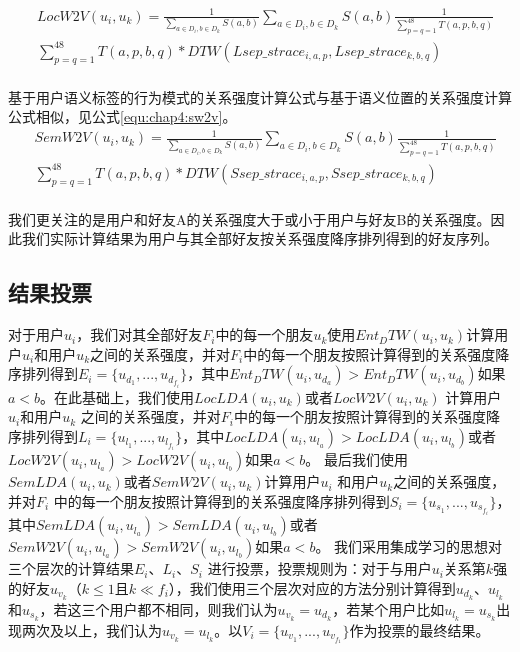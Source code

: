 \begin{equation}
\label{equ:chap4:lw2v}
\begin{split}
&LocW2V(u_{i},u_{k})=\frac{1}{\sum_{a\in D_{i},b\in D_{k}}S(a,b)}\sum_{a\in D_{i},b\in D_{k}}S(a,b)\frac{1}{\sum_{p=q=1}^{48}T(a,p,b,q)}\\
&\sum_{p=q=1}^{48}T(a,p,b,q)\ast DTW(Lsep\_strace_{i,a,p},Lsep\_strace_{k,b,q})\\
\end{split}
\end{equation}
\par 基于用户语义标签的行为模式的关系强度计算公式与基于语义位置的关系强度计算公式相似，见公式\ref{equ:chap4:sw2v}。
\begin{equation}
\label{equ:chap4:sw2v}
\begin{split}
&SemW2V(u_{i},u_{k})=\frac{1}{\sum_{a\in D_{i},b\in D_{k}}S(a,b)}\sum_{a\in D_{i},b\in D_{k}}S(a,b)\frac{1}{\sum_{p=q=1}^{48}T(a,p,b,q)}\\
&\sum_{p=q=1}^{48}T(a,p,b,q)\ast DTW(Ssep\_strace_{i,a,p},Ssep\_strace_{k,b,q})\\
\end{split}
\end{equation}
\par 我们更关注的是用户和好友A的关系强度大于或小于用户与好友B的关系强度。因此我们实际计算结果为用户与其全部好友按关系强度降序排列得到的好友序列。
\subsection{结果投票}
对于用户$u_{i}$，我们对其全部好友$F_{i}$中的每一个朋友$u_{k}$使用$Ent_DTW(u_{i},u_{k})$计算用户$u_{i}$和用户$u_{k}$之间的关系强度，并对$F_{i}$中的每一个朋友按照计算得到的关系强度降序排列得到$E_{i}=\{u_{d_{1}},...,u_{d_{f_{i}}}\}$，其中$Ent_DTW(u_{i},u_{d_{a}})>Ent_DTW(u_{i},u_{d_{b}})$如果$a<b$。在此基础上，我们使用$LocLDA(u_{i},u_{k})$或者$LocW2V(u_{i},u_{k})$ 计算用户$u_{i}$和用户$u_{k}$ 之间的关系强度，并对$F_{i}$中的每一个朋友按照计算得到的关系强度降序排列得到$L_{i}=\{u_{l_{1}},...,u_{l_{f_{i}}}\}$，其中$LocLDA(u_{i},u_{l_{a}})>LocLDA(u_{i},u_{l_{b}})$或者$LocW2V(u_{i},u_{l_{a}})>LocW2V(u_{i},u_{l_{b}})$如果$a<b$。 最后我们使用$SemLDA(u_{i},u_{k})$或者$SemW2V(u_{i},u_{k})$计算用户$u_{i}$ 和用户$u_{k}$之间的关系强度，并对$F_{i}$ 中的每一个朋友按照计算得到的关系强度降序排列得到$S_{i}=\{u_{s_{1}},...,u_{s_{f_{i}}}\}$，其中$SemLDA(u_{i},u_{l_{a}})>SemLDA(u_{i},u_{l_{b}})$或者$SemW2V(u_{i},u_{l_{a}})>SemW2V(u_{i},u_{l_{b}})$如果$a<b$。 我们采用集成学习的思想对三个层次的计算结果$E_{i}$、$L_{i}$、$S_{i}$ 进行投票，投票规则为：对于与用户$u_{i}$关系第$k$强的好友$u_{v_{k}}$（$k\leq 1$且$k\ll f_{i}$），我们使用三个层次对应的方法分别计算得到$u_{d_{k}}$、$u_{l_{k}}$ 和$u_{s_{k}}$，若这三个用户都不相同，则我们认为$u_{v_{k}}=u_{d_{k}}$，若某个用户比如$u_{l_{k}}=u_{s_{k}}$出现两次及以上，我们认为$u_{v_{k}}=u_{l_{k}}$。以$V_{i}=\{u_{v_{1}},...,u_{v_{f_{1}}}\}$作为投票的最终结果。
